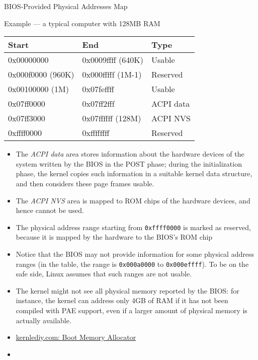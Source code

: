 \begin{frame}{BIOS-Provided Physical Addresses Map}
  \begin{block}{Example --- a typical computer with 128MB RAM}
    \begin{small}
      \begin{center}{\ttfamily
        \begin{tabular}{lll}
          Start&End&Type\\\hline
          0x00000000       &0x0009ffff (640K)&Usable\\
          0x000f0000 (960K)&0x000fffff (1M-1)&Reserved\\
          0x00100000 (1M)  &0x07feffff&Usable\\
          0x07ff0000       &0x07ff2fff&ACPI data\\
          0x07ff3000       &0x07ffffff (128M)&ACPI NVS\\
          0xffff0000       &0xffffffff&Reserved
        \end{tabular}}
      \end{center}
    \end{small}
  \end{block}
\end{frame}

\begin{itemize}
\item The \emph{ACPI data} area stores information about the hardware devices of the system
  written by the BIOS in the POST phase; during the initialization phase, the kernel
  copies such information in a suitable kernel data structure, and then considers these
  page frames usable.
\item The \emph{ACPI NVS} area is mapped to ROM chips of the hardware devices, and hence
  cannot be used.
\item The physical address range starting from \texttt{0xffff0000} is marked as reserved,
  because it is mapped by the hardware to the BIOS's ROM chip 
\item Notice that the BIOS may not provide information for some physical address ranges
  (in the table, the range is \texttt{0x000a0000} to \texttt{0x000effff}). To be on the safe
  side, Linux assumes that such ranges are not usable.
\item The kernel might not see all physical memory reported by the BIOS: for instance, the
  kernel can address only 4GB of RAM if it has not been compiled with PAE support, even
  if a larger amount of physical memory is actually available.
\item \href{http://kerneldiy.com/blog/?p=209}{kernlediy.com: Boot Memory Allocator}
\item {}
\end{itemize}

